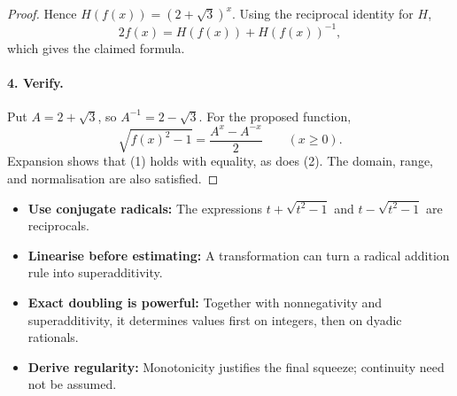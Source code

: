 \begin{dlsummary}[title={\bfseries Solution 45. The Conjugate-Radical Lock},breakable]
\begin{proof}
Hence \(H(f(x))=(2+\sqrt3)^x\). Using the reciprocal identity for \(H\),
\[
2f(x)=H(f(x))+H(f(x))^{-1},
\]
which gives the claimed formula.

\paragraph{4. Verify.}

Put \(A=2+\sqrt3\), so \(A^{-1}=2-\sqrt3\). For the proposed function,
\[
\sqrt{f(x)^2-1}=\frac{A^x-A^{-x}}2
\qquad(x\ge0).
\]
Expansion shows that (1) holds with equality, as does (2). The domain, range, and normalisation are also satisfied.
\end{proof}
\end{dlsummary}

\begin{takeaways}
\begin{itemize}
\item \textbf{Use conjugate radicals:} The expressions \(t+\sqrt{t^2-1}\) and \(t-\sqrt{t^2-1}\) are reciprocals.
\item \textbf{Linearise before estimating:} A transformation can turn a radical addition rule into superadditivity.
\item \textbf{Exact doubling is powerful:} Together with nonnegativity and superadditivity, it determines values first on integers, then on dyadic rationals.
\item \textbf{Derive regularity:} Monotonicity justifies the final squeeze; continuity need not be assumed.
\end{itemize}
\end{takeaways}

